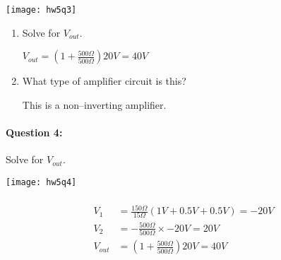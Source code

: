 \documentclass[12pt,letterpaper,titlepage]{article}
\begin{document}
\begin{raggedright}
\begin{center}
\texttt{[image: hw5q3]}
\end{center}

\begin{enumerate}[label=\Alph*)]
\item Solve for $V_{out}$.

$V_{out} = (1 + \frac{500\Omega}{500\Omega})20V = 40V$

\item What type of amplifier circuit is this?

This is a non--inverting amplifier.

\end{enumerate}


\clearpage

\paragraph{Question 4: }
Solve for $V_{out}$.

\begin{center}
\texttt{[image: hw5q4]}
\end{center}

\begin{align*}
\\ V_1     &= \frac{150\Omega}{15\Omega}(1V+0.5V+0.5V)=-20V
\\ V_2     &= - \frac{500\Omega}{500\Omega} \times -20V = 20V
\\ V_{out} &= (1 + \frac{500\Omega}{500\Omega})20V = 40V
\end{align*}

\end{raggedright}
\end{document}
